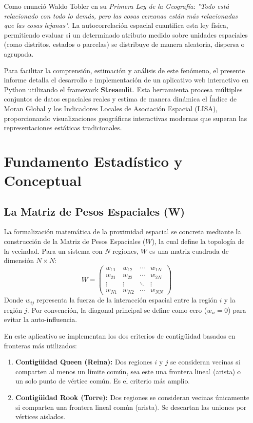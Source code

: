 \documentclass[a4paper,12pt]{article}
\begin{document}
Como enunció Waldo Tobler en su \textit{Primera Ley de la Geografía}: \textit{"Todo está relacionado con todo lo demás, pero las cosas cercanas están más relacionadas que las cosas lejanas"}. La autocorrelación espacial cuantifica esta ley física, permitiendo evaluar si un determinado atributo medido sobre unidades espaciales (como distritos, estados o parcelas) se distribuye de manera aleatoria, dispersa o agrupada. 

Para facilitar la comprensión, estimación y análisis de este fenómeno, el presente informe detalla el desarrollo e implementación de un aplicativo web interactivo en Python utilizando el framework \textbf{Streamlit}. Esta herramienta procesa múltiples conjuntos de datos espaciales reales y estima de manera dinámica el Índice de Moran Global y los Indicadores Locales de Asociación Espacial (LISA), proporcionando visualizaciones geográficas interactivas modernas que superan las representaciones estáticas tradicionales.

\section{Fundamento Estadístico y Conceptual}

\subsection{La Matriz de Pesos Espaciales (W)}
La formalización matemática de la proximidad espacial se concreta mediante la construcción de la Matriz de Pesos Espaciales ($W$), la cual define la topología de la vecindad. Para un sistema con $N$ regiones, $W$ es una matriz cuadrada de dimensión $N \times N$:
\[
W = \begin{pmatrix}
w_{11} & w_{12} & \cdots & w_{1N} \\
w_{21} & w_{22} & \cdots & w_{2N} \\
\vdots & \vdots & \ddots & \vdots \\
w_{N1} & w_{N2} & \cdots & w_{NN}
\end{pmatrix}
\]
Donde $w_{ij}$ representa la fuerza de la interacción espacial entre la región $i$ y la región $j$. Por convención, la diagonal principal se define como cero ($w_{ii} = 0$) para evitar la auto-influencia.

En este aplicativo se implementan los dos criterios de contigüidad basados en fronteras más utilizados:
\begin{enumerate}
    \item \textbf{Contigüidad Queen (Reina):} Dos regiones $i$ y $j$ se consideran vecinas si comparten al menos un límite común, sea este una frontera lineal (arista) o un solo punto de vértice común. Es el criterio más amplio.
    \item \textbf{Contigüidad Rook (Torre):} Dos regiones se consideran vecinas únicamente si comparten una frontera lineal común (arista). Se descartan las uniones por vértices aislados.
\end{enumerate}
\end{document}
